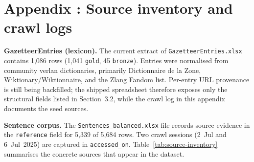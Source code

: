\documentclass[12pt]{article}
\newif\ifskipsectionclear
\begin{document}
\cleardoublepage
\skipsectioncleartrue
\section{Appendix \thesection: Source inventory and crawl logs}

\noindent \textbf{GazetteerEntries (lexicon).} The current extract of \texttt{GazetteerEntries.xlsx} contains 1{,}086 rows (1{,}041 \texttt{gold}, 45 \texttt{bronze}). Entries were normalised from community verlan dictionaries, primarily Dictionnaire de la Zone, Wiktionary/Wiktionnaire, and the Zlang Fandom list. Per-entry URL provenance is still being backfilled; the shipped spreadsheet therefore exposes only the structural fields listed in Section~3.2, while the crawl log in this appendix documents the seed sources.

\noindent \textbf{Sentence corpus.} The \texttt{Sentences\_balanced.xlsx} file records source evidence in the \texttt{reference} field for 5{,}339 of 5{,}684 rows. Two crawl sessions (2~Jul and 6~Jul~2025) are captured in \texttt{accessed\_on}. Table~\ref{tab:source-inventory} summarises the concrete sources that appear in the dataset.
\end{document}
